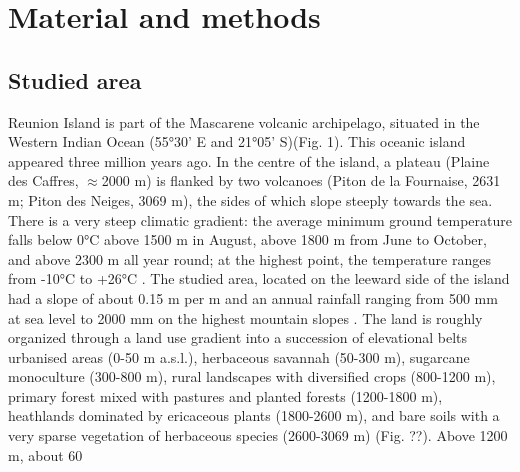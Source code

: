 \documentclass{article}
\begin{document}

\section*{Material and methods}

\subsection*{Studied area}
Reunion Island is part of the Mascarene volcanic archipelago, situated in the Western Indian Ocean (55°30’ E and 21°05’ S)(Fig. 1). This oceanic island appeared three million years ago. In the centre of the island, a plateau (Plaine des Caffres, $\approx$2000 m) is flanked by two volcanoes (Piton de la Fournaise, 2631 m; Piton des Neiges, 3069 m), the sides of which slope steeply towards the sea. There is a very steep climatic gradient: the average minimum ground temperature falls below 0°C above 1500 m in August, above 1800 m from June to October, and above 2300 m all year round; at the highest point, the temperature ranges from -10°C to +26°C \citep{Cadet1974,Raunet1991}.
The studied area, located on the leeward side of the island had a slope of about 0.15 m per m and an annual rainfall ranging from 500 mm at sea level to 2000 mm on the highest mountain slopes \cite{Raunet1991}. The land is roughly organized through a land use gradient into a succession of elevational belts \citep{Cadet1980} urbanised areas (0-50 m a.s.l.), herbaceous savannah (50-300 m), sugarcane monoculture (300-800 m), rural landscapes with diversified crops (800-1200 m), primary forest mixed with pastures and planted forests (1200-1800 m), heathlands dominated by ericaceous plants (1800-2600 m), and bare soils with a very sparse vegetation of herbaceous species (2600-3069 m) (Fig. ??). Above 1200 m, about 60 %
\end{document}
